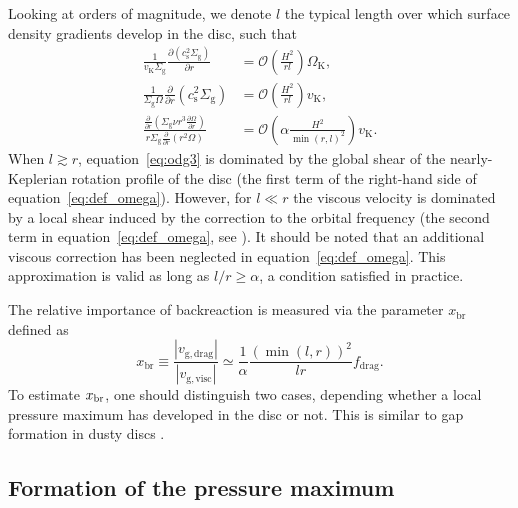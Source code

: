 \documentclass[a4paper,fleqn,usenatbib]{mnras}
\begin{document}
%
Looking at orders of magnitude, we denote $l$ the typical length over which surface density gradients develop in the disc, such that
%
\begin{align}
\frac{1}{v_\mathrm {K} \Sigma_\mathrm {g}}\frac{\partial \left(c_\mathrm{s}^{2} \Sigma_\mathrm{g} \right)}{\partial r}  & =   \mathcal{O}\left(\frac{H^{2}}{rl} \right) \Omega_\mathrm{K} , \label{eq:odg1} \\
\frac{1}{\Sigma_\mathrm{g} \Omega} \frac{\partial}{\partial r}\left(c_\mathrm{s}^2 \Sigma_\mathrm{g} \right) & = \mathcal{O}\left(\frac{H^{2}}{rl} \right) v_\mathrm{K} , \label{eq:odg2}\\
\frac{\displaystyle\frac{\partial}{\partial r}\left( \Sigma_\mathrm{g} \nu r^3 \frac{\partial \Omega}{\partial r} \right)}{r \Sigma_\mathrm{g} \displaystyle \frac{\partial}{\partial r} \left( r^2 \Omega \right)} & = \mathcal{O}\left(\alpha  \frac{H^{2}}{\min\left(r,l \right)^{2}} \right) v_\mathrm{K} \label{eq:odg3}.
\end{align}
%
When $l \gtrsim r$, equation~\ref{eq:odg3} is dominated by the global shear of the nearly-Keplerian rotation profile of the disc (the first term of the right-hand side of equation~\ref{eq:def_omega}). However, for $l \ll r $ the viscous velocity is dominated by a local shear induced by the correction to the orbital frequency (the second term in equation~\ref{eq:def_omega}, see \citealt{Kanagawa2015}). It should be noted that an additional viscous correction has been neglected in equation~\ref{eq:def_omega}. This approximation is valid as long as $l / r \ge \alpha $, a condition satisfied in practice. 

The relative importance of backreaction is measured via the parameter $x_\mathrm{br}$ defined as
%
\begin{equation}
x_\mathrm{br} \equiv \frac{\left| v_\mathrm{g,drag} \right| }{ \left| v_\mathrm{g,visc} \right| } \simeq \frac{1}{\alpha} \frac{(\min\left(l,r \right))^2}{lr} f_\mathrm{drag}.
\label{eq:def_xbr}
\end{equation}
 To estimate $x_{\rm br}$, one should distinguish two cases, depending whether a local pressure maximum has developed in the disc or not. This is similar to gap formation in dusty discs \citep{Dipierro2016}.

\subsection{Formation of the pressure maximum}
\end{document}
